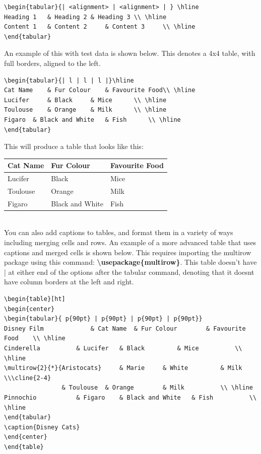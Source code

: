 \documentclass[10pt, titlepage]{article}
\begin{document}
\begin{lstlisting}
\begin{tabular}{| <alignment> | <alignment> | }	\hline
Heading 1 	& Heading 2	& Heading 3	\\ \hline
Content 1 	& Content 2 	& Content 3 	\\ \hline
\end{tabular}
\end{lstlisting}

An example of this with test data is shown below. This denotes a 4x4 table, with full borders, aligned to the left. 
\begin{lstlisting}
\begin{tabular}{| l | l | l |}\hline
Cat Name 	& Fur Colour 	& Favourite Food\\ \hline
Lucifer 	& Black 	& Mice 		\\ \hline
Toulouse 	& Orange 	& Milk 		\\ \hline
Figaro 	& Black and White 	& Fish 		\\ \hline
\end{tabular}
\end{lstlisting}

This will produce a table that looks like this: \\
\begin{tabular}{| l | l | l |}\hline
Cat Name 	& Fur Colour 	& Favourite Food\\ \hline
Lucifer 	& Black 	& Mice 		\\ \hline
Toulouse 	& Orange 	& Milk 		\\ \hline
Figaro 	& Black and White 	& Fish 		\\ \hline
\end{tabular}\\

You can also add captions to tables, and format them in a variety of ways including merging cells and rows. An example of a more advanced table that uses captions and merged cells is shown below. This requires importing the multirow package using this command: \textbf{\textbackslash usepackage\{multirow\}}. This table doesn't have | at either end of the options after the tabular command, denoting that it doesnt have column borders at the left and right. 
\begin{lstlisting}
\begin{table}[ht]
\begin{center}
\begin{tabular}{ p{90pt} | p{90pt} | p{90pt} | p{90pt}} 
Disney Film 			& Cat Name 	& Fur Colour 		& Favourite Food	\\ \hline
Cinderella 			& Lucifer 	& Black 		& Mice 			\\ \hline
\multirow{2}{*}{Aristocats} 	& Marie 	& White 		& Milk			\\\cline{2-4}
				& Toulouse 	& Orange 		& Milk			\\ \hline
Pinnochio 			& Figaro	& Black and White 	& Fish 			\\ \hline
\end{tabular}
\caption{Disney Cats}
\end{center}
\end{table}
\end{lstlisting}
\end{document}
